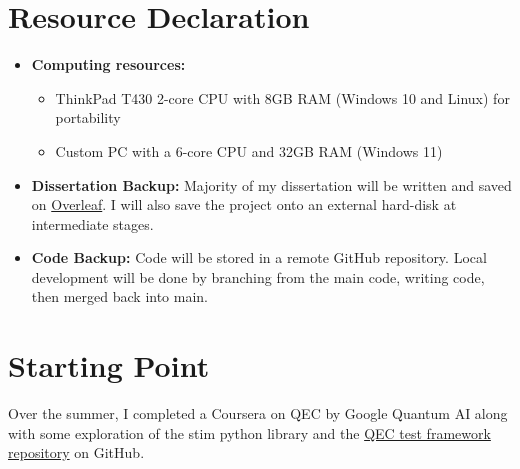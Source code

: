\section{Resource Declaration}
\begin{itemize}
    \item \textbf{Computing resources:}
        \begin{itemize}
            \item ThinkPad T430 2-core CPU with 8GB RAM (Windows 10 and Linux) for portability
            \item Custom PC with a 6-core CPU and 32GB RAM (Windows 11)
        \end{itemize}
    \item \textbf{Dissertation Backup:} Majority of my dissertation will be written and saved on \href{https://www.overleaf.com}{Overleaf}. I will also save the project onto an external hard-disk at intermediate stages.

    \item \textbf{Code Backup:} Code will be stored in a remote GitHub repository. Local development will be done by branching from the main code, writing code, then merged back into main.
\end{itemize}

\section{Starting Point}
Over the summer, I completed a Coursera on QEC by Google Quantum AI along with some exploration of the stim python library and the \href{https://eur03.safelinks.protection.outlook.com/?url=https%3A%2F%2Fgithub.com%2Fscottjones03%2Fpublic-material-2025%2Ftree%2Fmain&data=05%7C02%7Cme526%40cam.ac.uk%7C4332f74bac054c3f6e0908ddf3b5f0cd%7C49a50445bdfa4b79ade3547b4f3986e9%7C1%7C0%7C638934684941570154%7CUnknown%7CTWFpbGZsb3d8eyJFbXB0eU1hcGkiOnRydWUsIlYiOiIwLjAuMDAwMCIsIlAiOiJXaW4zMiIsIkFOIjoiTWFpbCIsIldUIjoyfQ%3D%3D%7C0%7C%7C%7C&sdata=qcgGlEcD0yaOa%2BshDJWb3NB59bPOL3gSbxWLu0kjf%2FM%3D&reserved=0}{QEC test framework repository} on GitHub.

